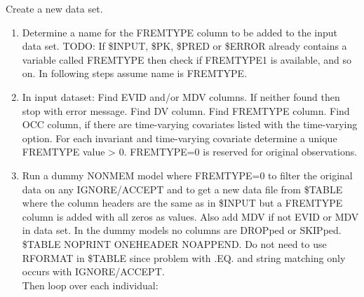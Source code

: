 \documentclass[a4paper,12pt]{article}
\begin{document}
Create a new data set.
\begin{enumerate} 
	\item Determine a name for the FREMTYPE column to be added to the input data set. TODO: If \$INPUT, \$PK, \$PRED or \$ERROR already contains a variable called FREMTYPE then check if FREMTYPE1 is available, and so on. In following steps assume name is FREMTYPE.
	\item In input dataset: Find EVID and/or MDV columns. If neither found then stop with error message. Find DV column. Find FREMTYPE column. Find OCC column, if there are time-varying covariates listed with the time-varying option. For each invariant and time-varying covariate  determine a unique FREMTYPE value > 0. FREMTYPE=0 is reserved for original observations.
	\item Run a dummy NONMEM model where FREMTYPE=0 to filter the original data on any IGNORE/ACCEPT and to get a new data file from \$TABLE where the column headers are the same as in \$INPUT but a FREMTYPE column is added with all zeros as values. Also add MDV if not EVID or MDV in data set. In the dummy models no columns are DROPped or SKIPped. \$TABLE NOPRINT ONEHEADER NOAPPEND.  Do not need to use RFORMAT in \$TABLE since problem with .EQ. and string matching only occurs with IGNORE/ACCEPT.
\\
Then loop over each individual: 


\end{enumerate}
\end{document}

